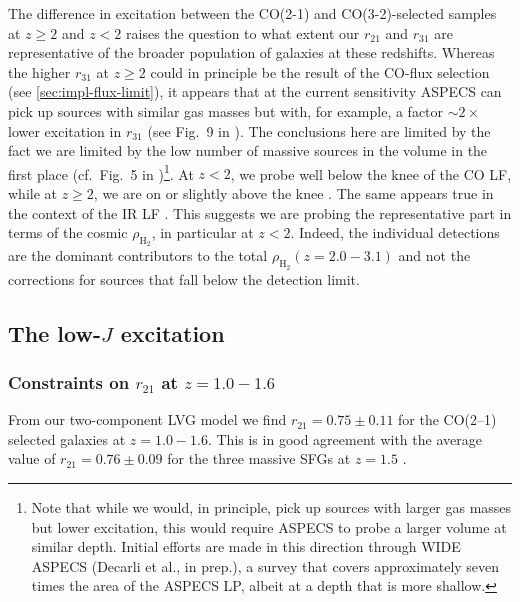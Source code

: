 \documentclass[twocolumn]{aastex62}
\newcommand{\HH}{\ensuremath{\mathrm{H}_{2}}}
\newcommand{\rhoHH}{\ensuremath{\rho_{\HH}}}
\newcommand{\rTwoOneLVGzLoTwo}{\ensuremath{0.75 \pm 0.11}}
\begin{document}
The difference in excitation between the CO(2-1) and CO(3-2)-selected samples
at $z\ge2$ and $z<2$ raises the question to what extent our $r_{21}$ and
$r_{31}$ are representative of the broader population of galaxies at these
redshifts.  Whereas the higher $r_{31}$ at $z\ge2$ could in principle be the
result of the CO-flux selection (see \autoref{sec:impl-flux-limit}), it appears
that at the current sensitivity ASPECS can pick up sources with similar gas
masses but with, for example, a factor $\sim 2\times$ lower excitation in
$r_{31}$ (see Fig.~9 in \citealt{Boogaard2019}).  The conclusions here are
limited by the fact we are limited by the low number of massive sources in the
volume in the first place (cf.\ Fig.~5 in \citealt{Boogaard2019})\footnote{Note
  that while we would, in principle, pick up sources with larger gas masses but
  lower excitation, this would require ASPECS to probe a larger volume at
  similar depth.  Initial efforts are made in this direction through WIDE
  ASPECS (Decarli et al., in prep.), a survey that covers approximately seven
  times the area of the ASPECS LP, albeit at a depth that is more shallow.}.
At $z<2$, we probe well below the knee of the CO LF, while at $z\ge2$, we are
on or slightly above the knee \citep[][]{Decarli2019}.  The same appears true
in the context of the IR LF \citep[e.g.,][]{Gruppioni2013}.  This suggests we
are probing the representative part in terms of the cosmic $\rhoHH$, in
particular at $z<2$.  Indeed, the individual detections are the dominant
contributors to the total $\rhoHH(z=2.0-3.1)$ \citep{Decarli2019} and not the
corrections for sources that fall below the detection limit.

\subsection{The low-$J$ excitation}
\label{sec:low-j-exc}
\subsubsection{Constraints on $r_{21}$ at $z=1.0-1.6$}
\label{sec:constraints-r21}
From our two-component LVG model we find $r_{21} = \rTwoOneLVGzLoTwo$ for the
CO(2--1) selected galaxies at $z=1.0 -1.6$.  This is in good agreement with the
average value of $r_{21} = 0.76 \pm 0.09$ for the three massive SFGs at $z=1.5$
\citep[][which are well described by a two-component model]{Daddi2015}.
\end{document}

